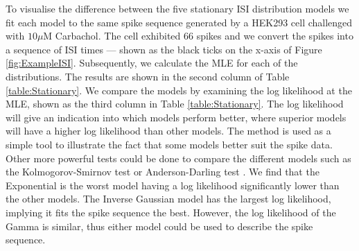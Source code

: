 \documentclass[oneside, 12 pt]{book}
\begin{document}
To visualise the difference between the five stationary ISI distribution models we fit each model to the same spike sequence generated by a HEK293 cell challenged with $10\mu \mathrm{M}$ Carbachol. The cell exhibited 66  spikes and we convert the spikes into a sequence of ISI times --- shown as the black ticks on the x-axis of Figure \ref{fig:ExampleISI}. Subsequently, we calculate the MLE for each of the distributions. The results are shown in the second column of Table \ref{table:Stationary}. We compare the models by examining the log likelihood at the MLE, shown as the third column in Table \ref{table:Stationary}. The log likelihood will give an indication into which models perform better, where superior models will have a higher log likelihood than other models. The method is used as a simple tool to illustrate the fact that some models better suit the  spike data. Other more powerful tests could be done to compare the different models such as the Kolmogorov-Smirnov test \cite{Massey_1951} or Anderson-Darling test \cite{Anderson_1954}. We find that the Exponential is the worst model having a log likelihood significantly lower than the other models. The Inverse Gaussian model has the largest log likelihood, implying it fits the spike sequence the best. However, the log likelihood of the Gamma is similar, thus either model could be used to describe the spike sequence.
\end{document}
